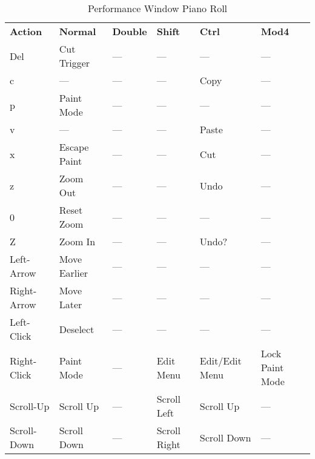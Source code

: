    \begin{table}
      \centering
      \caption{Performance Window Piano Roll}
      \label{table:perf_window_piano_roll}
      \begin{tabular}{l l l l l l}
         \textbf{Action}   & \textbf{Normal} & \textbf{Double}    & 
            \textbf{Shift} & \textbf{Ctrl}   & \textbf{Mod4}      \\
         Del               & Cut Trigger     & ---                &
            ---            & ---             & ---                \\
         c                 & ---             & ---                &
            ---            & Copy            & ---                \\
         p                 & Paint Mode      & ---                &
            ---            & ---             & ---                \\
         v                 & ---             & ---                &
            ---            & Paste           & ---                \\
         x                 & Escape Paint    & ---                &
            ---            & Cut             & ---                \\
         z                 & Zoom Out        & ---                &
            ---            & Undo            & ---                \\
         0                 & Reset Zoom      & ---                &
            ---            & ---             & ---                \\
         Z                 & Zoom In         & ---                &
            ---            & Undo?           & ---                \\
         Left-Arrow        & Move Earlier    & ---                &
            ---            & ---             & ---                \\
         Right-Arrow       & Move Later      & ---                &
            ---            & ---             & ---                \\
         Left-Click        & Deselect        & ---                &
            ---            & ---             & ---                \\
         Right-Click       & Paint Mode      & ---                &
            Edit Menu      & Edit/Edit Menu  & Lock Paint Mode    \\
         Scroll-Up         & Scroll Up       & ---                &
            Scroll Left    & Scroll Up       & ---                \\
         Scroll-Down       & Scroll Down     & ---                &
            Scroll Right   & Scroll Down     & ---                \\
      \end{tabular}
   \end{table}

